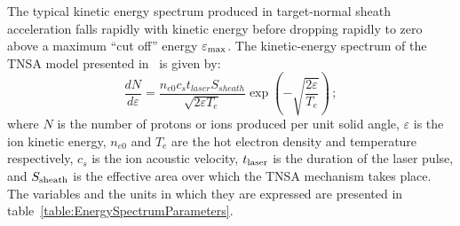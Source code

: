 The typical kinetic energy spectrum produced in target-normal sheath
acceleration falls rapidly with kinetic energy before dropping rapidly
to zero above a maximum ``cut off'' energy $\varepsilon_{\rm max}$.
The kinetic-energy spectrum of the TNSA model presented
in~\cite{10.1038/nphys199} is given by:
\begin{equation}
  \frac{dN}{d\varepsilon} = \frac{n_{e0} c_{s} t_{laser} S_{sheath}}
                                 {\sqrt{2\varepsilon T_{e}}}
                                 \exp\left(
                                     - \sqrt{\frac{2\varepsilon}{T_{e}}}
                                     \right)\,;
  \label{Eq:Spct:0}
\end{equation}
where $N$ is the number of protons or ions produced per unit solid
angle, $\varepsilon$ is the ion kinetic energy, $n_{e0}$ and
$T_e$ are the hot electron density and temperature respectively, $c_s$
is the ion acoustic velocity, $t_{\rm laser}$ is the duration of the
laser pulse, and $S_{\rm sheath}$ is the effective area over which the
TNSA mechanism takes place.
The variables and the units in which they are expressed are presented
in table~\ref{table:EnergySpectrumParameters}.
